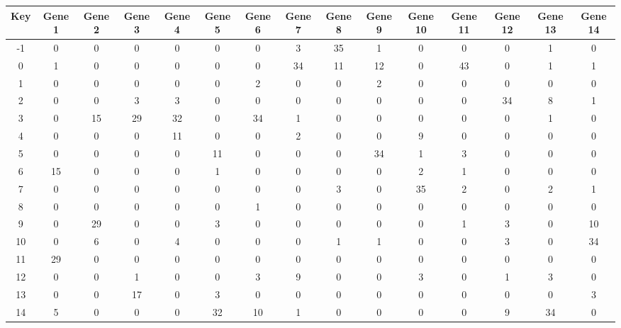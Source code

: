\begin{tabular}{|c|c|c|c|c|c|c|c|c|c|c|c|c|c|c|}
\hline
Key & Gene 1 & Gene 2 & Gene 3 & Gene 4 & Gene 5 & Gene 6 & Gene 7 & Gene 8 & Gene 9 & Gene 10 & Gene 11 & Gene 12 & Gene 13 & Gene 14 \\
\hline
-1 & 0 & 0 & 0 & 0 & 0 & 0 & 3 & 35 & 1 & 0 & 0 & 0 & 1 & 0 \\
0 & 1 & 0 & 0 & 0 & 0 & 0 & 34 & 11 & 12 & 0 & 43 & 0 & 1 & 1 \\
1 & 0 & 0 & 0 & 0 & 0 & 2 & 0 & 0 & 2 & 0 & 0 & 0 & 0 & 0 \\
2 & 0 & 0 & 3 & 3 & 0 & 0 & 0 & 0 & 0 & 0 & 0 & 34 & 8 & 1 \\
3 & 0 & 15 & 29 & 32 & 0 & 34 & 1 & 0 & 0 & 0 & 0 & 0 & 1 & 0 \\
4 & 0 & 0 & 0 & 11 & 0 & 0 & 2 & 0 & 0 & 9 & 0 & 0 & 0 & 0 \\
5 & 0 & 0 & 0 & 0 & 11 & 0 & 0 & 0 & 34 & 1 & 3 & 0 & 0 & 0 \\
6 & 15 & 0 & 0 & 0 & 1 & 0 & 0 & 0 & 0 & 2 & 1 & 0 & 0 & 0 \\
7 & 0 & 0 & 0 & 0 & 0 & 0 & 0 & 3 & 0 & 35 & 2 & 0 & 2 & 1 \\
8 & 0 & 0 & 0 & 0 & 0 & 1 & 0 & 0 & 0 & 0 & 0 & 0 & 0 & 0 \\
9 & 0 & 29 & 0 & 0 & 3 & 0 & 0 & 0 & 0 & 0 & 1 & 3 & 0 & 10 \\
10 & 0 & 6 & 0 & 4 & 0 & 0 & 0 & 1 & 1 & 0 & 0 & 3 & 0 & 34 \\
11 & 29 & 0 & 0 & 0 & 0 & 0 & 0 & 0 & 0 & 0 & 0 & 0 & 0 & 0 \\
12 & 0 & 0 & 1 & 0 & 0 & 3 & 9 & 0 & 0 & 3 & 0 & 1 & 3 & 0 \\
13 & 0 & 0 & 17 & 0 & 3 & 0 & 0 & 0 & 0 & 0 & 0 & 0 & 0 & 3 \\
14 & 5 & 0 & 0 & 0 & 32 & 10 & 1 & 0 & 0 & 0 & 0 & 9 & 34 & 0 \\
\hline
\end{tabular}